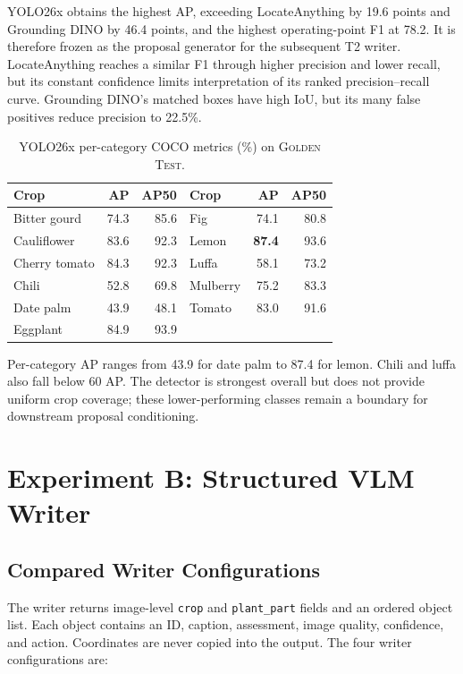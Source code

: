 \documentclass[11pt]{article}
\newcommand{\gold}{\textsc{Golden Test}}
\newcommand{\best}[1]{\textbf{#1}}
\begin{document}
YOLO26x obtains the highest AP, exceeding LocateAnything by 19.6 points and
Grounding DINO by 46.4 points, and the highest operating-point F1 at 78.2. It is
therefore frozen as the proposal generator for the subsequent T2 writer.
LocateAnything reaches a similar F1 through higher precision and lower recall,
but its constant confidence limits interpretation of its ranked
precision--recall curve. Grounding DINO's matched boxes have high IoU, but its
many false positives reduce precision to 22.5\%.

\begin{table}[H]
\centering
\small
\setlength{\tabcolsep}{2.5pt}
\begin{tabular}{lrr@{\hspace{4pt}}lrr}
\toprule
Crop & AP & AP50 & Crop & AP & AP50 \\
\midrule
Bitter gourd & 74.3 & 85.6 & Fig & 74.1 & 80.8 \\
Cauliflower & 83.6 & 92.3 & Lemon & \best{87.4} & 93.6 \\
Cherry tomato & 84.3 & 92.3 & Luffa & 58.1 & 73.2 \\
Chili & 52.8 & 69.8 & Mulberry & 75.2 & 83.3 \\
Date palm & 43.9 & 48.1 & Tomato & 83.0 & 91.6 \\
Eggplant & 84.9 & 93.9 & & & \\
\bottomrule
\end{tabular}
\caption{YOLO26x per-category COCO metrics (\%) on \gold.}
\label{tab:per-category}
\end{table}

Per-category AP ranges from 43.9 for date palm to 87.4 for lemon. Chili and
luffa also fall below 60 AP. The detector is strongest overall but does not
provide uniform crop coverage; these lower-performing classes remain a boundary
for downstream proposal conditioning.

\FloatBarrier

\section{Experiment B: Structured VLM Writer}

\subsection{Compared Writer Configurations}

The writer returns image-level \texttt{crop} and \texttt{plant\_part} fields and
an ordered object list. Each object contains an ID, caption, assessment, image
quality, confidence, and action. Coordinates are never copied into the output.
The four writer configurations are:
\end{document}
